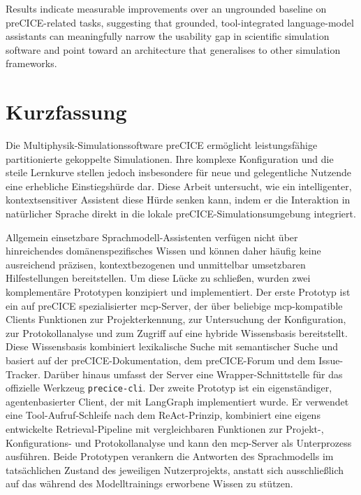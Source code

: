 \documentclass[
  numbers=noenddot,
  english,
  a4paper,
  twoside,
  bibliography=totoc,
  headsepline,
  cleardoublepage=empty,
  parskip=half,
  draft=false
]{scrbook}
\theoremstyle{break}
\renewcommand{\_}{\textunderscore\allowbreak}
\begin{document}
Results indicate measurable improvements over an ungrounded baseline on preCICE-related
tasks, suggesting that grounded, tool-integrated language-model assistants can meaningfully
narrow the usability gap in scientific simulation software and point toward an architecture
that generalises to other simulation frameworks.


\section*{Kurzfassung}

Die Multiphysik-Simulationssoftware preCICE ermöglicht leistungsfähige partitionierte
gekoppelte Simulationen. Ihre komplexe Konfiguration und die steile Lernkurve stellen
jedoch insbesondere für neue und gelegentliche Nutzende eine erhebliche Einstiegshürde dar.
Diese Arbeit untersucht, wie ein intelligenter, kontextsensitiver Assistent diese Hürde
senken kann, indem er die Interaktion in natürlicher Sprache direkt in die lokale
preCICE-Simulationsumgebung integriert.

Allgemein einsetzbare Sprachmodell-Assistenten verfügen nicht über hinreichendes
domänenspezifisches Wissen und können daher häufig keine ausreichend präzisen,
kontextbezogenen und unmittelbar umsetzbaren Hilfestellungen bereitstellen.
Um diese Lücke zu schließen, wurden zwei komplementäre Prototypen konzipiert und
implementiert. Der erste Prototyp ist ein auf preCICE spezialisierter
\gls{mcp}-Server, der über beliebige \gls{mcp}-kompatible Clients Funktionen zur
Projekterkennung, zur Untersuchung der Konfiguration, zur Protokollanalyse und zum
Zugriff auf eine hybride Wissensbasis bereitstellt. Diese Wissensbasis kombiniert
lexikalische Suche mit semantischer Suche und basiert auf der preCICE-Dokumentation,
dem preCICE-Forum und dem Issue-Tracker. Darüber hinaus umfasst der Server eine
Wrapper-Schnittstelle für das offizielle Werkzeug \texttt{precice-cli}.
Der zweite Prototyp ist ein eigenständiger, agentenbasierter Client, der mit LangGraph
implementiert wurde. Er verwendet eine Tool-Aufruf-Schleife nach dem ReAct-Prinzip,
kombiniert eine eigens entwickelte Retrieval-Pipeline mit vergleichbaren Funktionen zur
Projekt-, Konfigurations- und Protokollanalyse und kann den \gls{mcp}-Server als
Unterprozess ausführen. Beide Prototypen verankern die Antworten des Sprachmodells
im tatsächlichen Zustand des jeweiligen Nutzerprojekts, anstatt sich ausschließlich auf
das während des Modelltrainings erworbene Wissen zu stützen.
\end{document}
